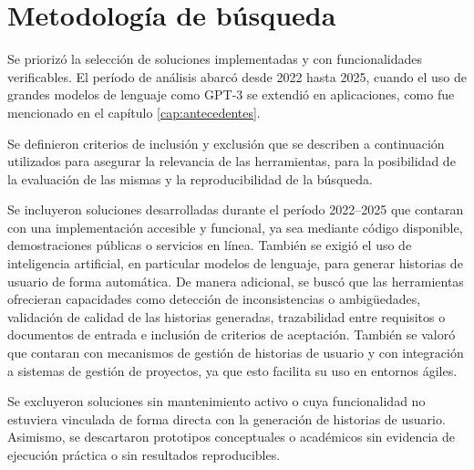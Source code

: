 \section{Metodología de búsqueda}
Se priorizó la selección de soluciones implementadas y con funcionalidades verificables. El período de análisis abarcó desde 2022 hasta 2025, cuando el uso de grandes modelos de lenguaje como GPT-3 se extendió en aplicaciones, como fue mencionado en el capítulo \ref{cap:antecedentes}.

Se definieron criterios de inclusión y exclusión que se describen a continuación utilizados para asegurar la relevancia de las herramientas, para la posibilidad de la evaluación de las mismas y la reproducibilidad de la búsqueda.

Se incluyeron soluciones desarrolladas durante el período 2022–2025 que contaran con una implementación accesible y funcional, ya sea mediante código disponible, demostraciones públicas o servicios en línea. También se exigió el uso de inteligencia artificial, en particular modelos de lenguaje, para generar historias de usuario de forma automática. De manera adicional, se buscó que las herramientas ofrecieran capacidades como detección de inconsistencias o ambigüedades, validación de calidad de las historias generadas, trazabilidad entre requisitos o documentos de entrada e inclusión de criterios de aceptación. También se valoró que contaran con mecanismos de gestión de historias de usuario y con integración a sistemas de gestión de proyectos, ya que esto facilita su uso en entornos ágiles.

Se excluyeron soluciones sin mantenimiento activo o cuya funcionalidad no estuviera vinculada de forma directa con la generación de historias de usuario. Asimismo, se descartaron prototipos conceptuales o académicos sin evidencia de ejecución práctica o sin resultados reproducibles.

